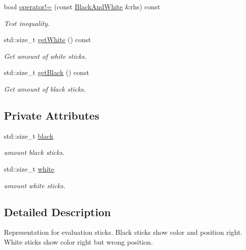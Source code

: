 \begin{DoxyCompactItemize}
$$bool \hyperlink{classmastermind_1_1logic_1_1_black_and_white_a8d622959805faeb3f63b0342667b58f7}{operator!=} (const \hyperlink{classmastermind_1_1logic_1_1_black_and_white}{Black\+And\+White} \&rhs) const
\begin{DoxyCompactList}\small\item\em Test inequality. \end{DoxyCompactList}\item 
std\+::size\+\_\+t \hyperlink{classmastermind_1_1logic_1_1_black_and_white_a85a1deac6d5cae64adce52aee8604fb0}{get\+White} () const
\begin{DoxyCompactList}\small\item\em Get amount of white sticks. \end{DoxyCompactList}\item 
std\+::size\+\_\+t \hyperlink{classmastermind_1_1logic_1_1_black_and_white_a5215b8ea947ec23c323448b46ba9e897}{get\+Black} () const
\begin{DoxyCompactList}\small\item\em Get amount of black sticks. \end{DoxyCompactList}\end{DoxyCompactItemize}
\subsection*{Private Attributes}
\begin{DoxyCompactItemize}
\item 
std\+::size\+\_\+t \hyperlink{classmastermind_1_1logic_1_1_black_and_white_a63bc0b99519882a72c21afe1ac3ef2ae}{black}
\begin{DoxyCompactList}\small\item\em amount black sticks. \end{DoxyCompactList}\item 
std\+::size\+\_\+t \hyperlink{classmastermind_1_1logic_1_1_black_and_white_ad5a31a26cbaf5294fac2f6ddf565408d}{white}
\begin{DoxyCompactList}\small\item\em amount white sticks. \end{DoxyCompactList}\end{DoxyCompactItemize}


\subsection{Detailed Description}
Representation for evaluation sticks. Black sticks show color and position right. White sticks show color right but wrong position. 

